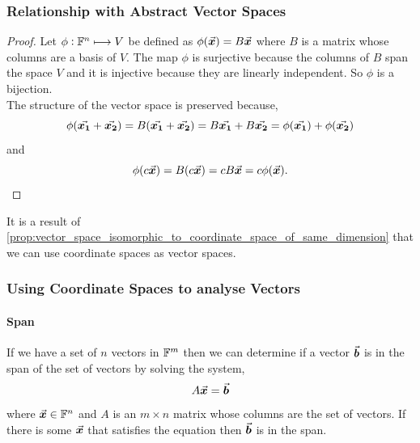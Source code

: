 \documentclass[MathsNotesBase.tex]{subfiles}
\begin{document}
{	\bigskip
	\subsubsection{Relationship with Abstract Vector Spaces}
	\medskip
	\begin{proof}
		Let ${ \phi: \mathbb{F}^{n} \longmapsto V }$ be defined as ${ \phi(\vec{\bm{x}}) = B\vec{\bm{x}} }$ where $B$ is a matrix whose columns are a basis of $V$. The map $\phi$ is surjective because the columns of $B$ span the space $V$ and it is injective because they are linearly independent. So $\phi$ is a bijection.\\
		The structure of the vector space is preserved because,
		\[ \phi(\vec{\bm{x_1}} + \vec{\bm{x_2}}) = B(\vec{\bm{x_1}} + \vec{\bm{x_2}}) = B\vec{\bm{x_1}} + B\vec{\bm{x_2}} = \phi(\vec{\bm{x_1}}) + \phi(\vec{\bm{x_2}}) \]
		and
		\[ \phi(c\vec{\bm{x}}) = B(c\vec{\bm{x}}) = cB\vec{\bm{x}} = c\phi(\vec{\bm{x}}). \]
	\end{proof}

	\medskip
	
	\medskip
	It is a result of \autoref{prop:vector_space_isomorphic_to_coordinate_space_of_same_dimension} that we can use coordinate spaces as vector spaces.
	
	\bigskip
	\subsubsection{Using Coordinate Spaces to analyse Vectors}
	
	\bigskip\paragraph{Span} If we have a set of $n$ vectors in $\mathbb{F}^{m}$ then we can determine if a vector $\vec{\bm{b}}$ is in the span of the set of vectors by solving the system,
		\[ A\vec{\bm{x}} = \vec{\bm{b}} \]
		where ${ \vec{\bm{x}} \in \mathbb{F}^{n} }$ and $A$ is an ${ m \times n }$ matrix whose columns are the set of vectors. If there is some $\vec{\bm{x}}$ that satisfies the equation then $\vec{\bm{b}}$ is in the span.
	
}
\end{document}
